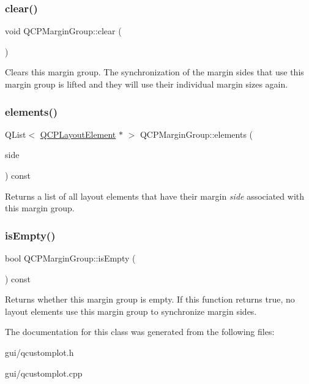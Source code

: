 \subsubsection{\texorpdfstring{clear()}{clear()}}
{\footnotesize\ttfamily void Q\+C\+P\+Margin\+Group\+::clear (\begin{DoxyParamCaption}{ }\end{DoxyParamCaption})}

Clears this margin group. The synchronization of the margin sides that use this margin group is lifted and they will use their individual margin sizes again. \mbox{\label{classQCPMarginGroup_ac967a4dc5fe02ae44aeb43511d5e1bd4}} 
\subsubsection{\texorpdfstring{elements()}{elements()}}
{\footnotesize\ttfamily Q\+List$<$ \hyperlink{classQCPLayoutElement}{Q\+C\+P\+Layout\+Element} $\ast$ $>$ Q\+C\+P\+Margin\+Group\+::elements (\begin{DoxyParamCaption}\item[{\hyperlink{namespaceQCP_a7e487e3e2ccb62ab7771065bab7cae54}{Q\+C\+P\+::\+Margin\+Side}}]{side }\end{DoxyParamCaption}) const\hspace{0.3cm}{\ttfamily [inline]}}

Returns a list of all layout elements that have their margin {\itshape side} associated with this margin group. \mbox{\label{classQCPMarginGroup_ae0d32656d8a5fc5690c4e7693f9d0539}} 
\subsubsection{\texorpdfstring{is\+Empty()}{isEmpty()}}
{\footnotesize\ttfamily bool Q\+C\+P\+Margin\+Group\+::is\+Empty (\begin{DoxyParamCaption}{ }\end{DoxyParamCaption}) const}

Returns whether this margin group is empty. If this function returns true, no layout elements use this margin group to synchronize margin sides. 

The documentation for this class was generated from the following files\+:\begin{DoxyCompactItemize}
\item 
gui/qcustomplot.\+h\item 
gui/qcustomplot.\+cpp\end{DoxyCompactItemize}
